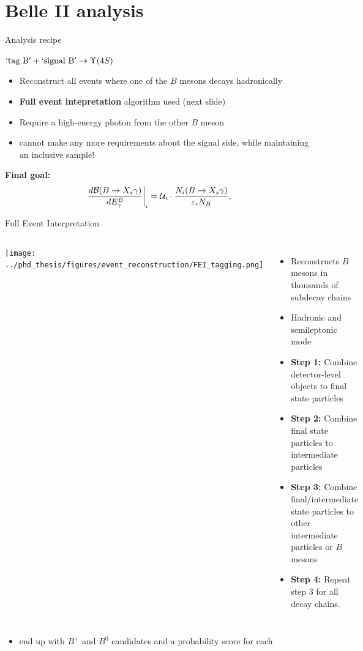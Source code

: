 \documentclass[xcolor=dvipsnames]{beamer}
\begin{document}
   \section{Belle II analysis}

   \begin{frame}{Analysis recipe}
      \small
      
      $\mathrm{`tag~B'} + \mathrm{`signal~B'} \ra \FourS$
     
      \begin{itemize}
         \item Reconstruct all events where one of the $B$ mesons decays hadronically
         \item[\to] \textbf{Full event intepretation} algorithm used (next slide)
         \item Require a high-energy photon from the other $B$ meson
         \item[\to] cannot make any more requirements about the signal side, while maintaining an inclusive sample!
      \end{itemize}
\textbf{Final goal:}
      \begin{equation}\nonumber
         \left.\frac{d\mathcal{B}(\BtoXsgamma)}{d\EB}\right|_i = \mathcal{U}_i \cdot \frac{N_i(\BtoXsgamma)}{\varepsilon_i N_{B}},
      \end{equation}
   \end{frame}


   \begin{frame}{Full Event Interpretation}
      \small
   \begin{columns}
         \texttt{[image: ../phd\_thesis/figures/event\_reconstruction/FEI\_tagging.png]}
         \begin{itemize}
            \item Reconstructs $B$ mesons in thousands of subdecay chains
            \item Hadronic and semileptonic mode
            \item \textbf{Step 1:} Combine detector-level objects to final state particles
            \item \textbf{Step 2:} Combine final state particles to intermediate particles
            \item \textbf{Step 3:} Combine final/intermediate state particles to other intermediate particles or $B$ mesons
            \item \textbf{Step 4:} Repeat step 3 for all decay chains.
         \end{itemize}
      
   \end{columns}
\begin{itemize}
   \item[\ra] end up with $B^+$ and $B^0$ candidates and a probability score \feiProb for each
\end{itemize}   
\end{frame}
\end{document}
